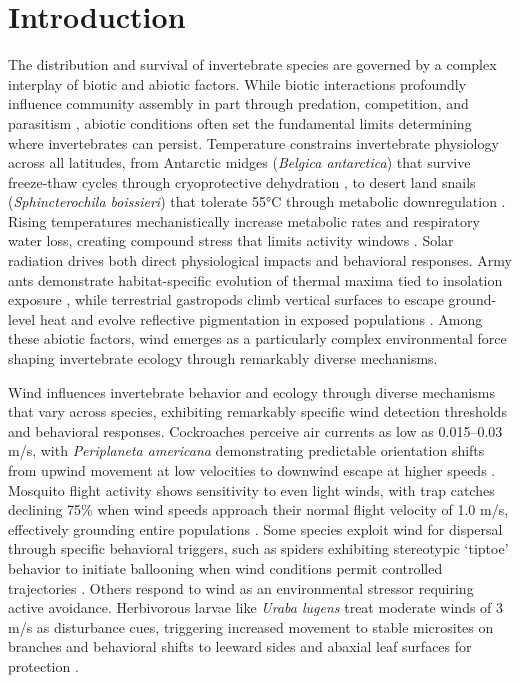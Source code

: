 \usepackage{hyperref}
\usepackage{longtable}

\chapter{Introduction}
\label{ch:introduction}

The distribution and survival of invertebrate species are governed by a complex interplay of biotic and abiotic factors. While biotic interactions profoundly influence community assembly in part through predation, competition, and parasitism \citep{blois-heulinDirectIndirectEffects1990,laffertyComparingMechanismsHost2013,miller-terkuilePredatorPreyInteractions2022}, abiotic conditions often set the fundamental limits determining where invertebrates can persist. Temperature constrains invertebrate physiology across all latitudes, from Antarctic midges (\textit{Belgica antarctica}) that survive freeze-thaw cycles through cryoprotective dehydration \citep{everattResponsesInvertebratesTemperature2015}, to desert land snails (\textit{Sphincterochila boissieri}) that tolerate 55°C through metabolic downregulation \citep{schweizerSnailsSunStrategies2019}. Rising temperatures mechanistically increase metabolic rates and respiratory water loss, creating compound stress that limits activity windows \citep{chownWaterLossInsects2011}. Solar radiation drives both direct physiological impacts and behavioral responses. Army ants demonstrate habitat-specific evolution of thermal maxima tied to insolation exposure \citep{baudierExtremeInsolationClimatic2018}, while terrestrial gastropods climb vertical surfaces to escape ground-level heat and evolve reflective pigmentation in exposed populations \citep{schweizerSnailsSunStrategies2019}. Among these abiotic factors, wind emerges as a particularly complex environmental force shaping invertebrate ecology through remarkably diverse mechanisms.

Wind influences invertebrate behavior and ecology through diverse mechanisms that vary across species, exhibiting remarkably specific wind detection thresholds and behavioral responses. Cockroaches perceive air currents as low as 0.015--0.03 m/s, with \textit{Periplaneta americana} demonstrating predictable orientation shifts from upwind movement at low velocities to downwind escape at higher speeds \citep{bellSearchAnemotacticOrientation1979}. Mosquito flight activity shows sensitivity to even light winds, with trap catches declining 75\% when wind speeds approach their normal flight velocity of 1.0 m/s, effectively grounding entire populations \citep{bidlingmayerEffectWindVelocity1974}. Some species exploit wind for dispersal through specific behavioral triggers, such as spiders exhibiting stereotypic `tiptoe' behavior to initiate ballooning when wind conditions permit controlled trajectories \citep{bonteHeritabilitySpiderBallooning2007}. Others respond to wind as an environmental stressor requiring active avoidance. Herbivorous larvae like \textit{Uraba lugens} treat moderate winds of 3 m/s as disturbance cues, triggering increased movement to stable microsites on branches and behavioral shifts to leeward sides and abaxial leaf surfaces for protection \citep{leonardExposureWindAlters2016}.

